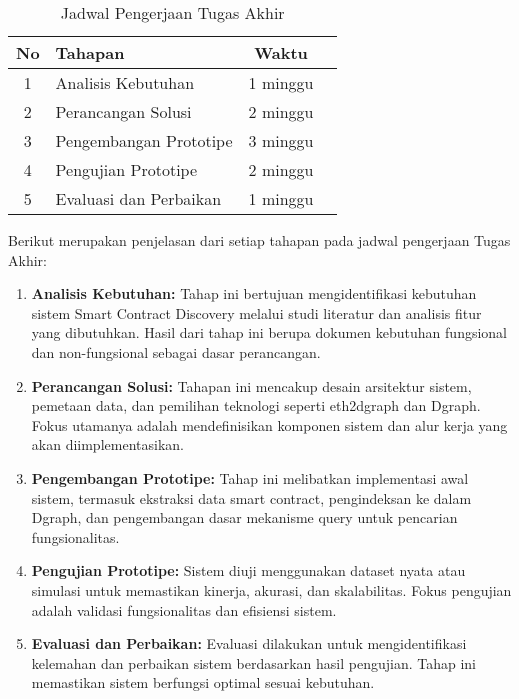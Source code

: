 \begin{table}[h]
	\caption{Jadwal Pengerjaan Tugas Akhir}
	\vspace{0.25cm}
	\begin{center}
		\begin{tabular}{|c|l|c|l|}
			\hline
			\textbf{No} & \textbf{Tahapan} & \textbf{Waktu} \\ \hline
			1 & Analisis Kebutuhan & 1 minggu \\ \hline
			2 & Perancangan Solusi & 2 minggu \\ \hline
			3 & Pengembangan Prototipe & 3 minggu \\ \hline
			4 & Pengujian Prototipe & 2 minggu \\ \hline
			5 & Evaluasi dan Perbaikan & 1 minggu \\ \hline
		\end{tabular}
	\end{center}
\end{table}

Berikut merupakan penjelasan dari setiap tahapan pada jadwal pengerjaan Tugas Akhir:

\begin{enumerate}
  \item \textbf{Analisis Kebutuhan:} Tahap ini bertujuan mengidentifikasi kebutuhan sistem Smart Contract Discovery melalui studi literatur dan analisis fitur yang dibutuhkan. Hasil dari tahap ini berupa dokumen kebutuhan fungsional dan non-fungsional sebagai dasar perancangan. 
  \item \textbf{Perancangan Solusi:} Tahapan ini mencakup desain arsitektur sistem, pemetaan data, dan pemilihan teknologi seperti eth2dgraph dan Dgraph. Fokus utamanya adalah mendefinisikan komponen sistem dan alur kerja yang akan diimplementasikan.
  \item \textbf{Pengembangan Prototipe:} Tahap ini melibatkan implementasi awal sistem, termasuk ekstraksi data smart contract, pengindeksan ke dalam Dgraph, dan pengembangan dasar mekanisme query untuk pencarian fungsionalitas.
  \item \textbf{Pengujian Prototipe:} Sistem diuji menggunakan dataset nyata atau simulasi untuk memastikan kinerja, akurasi, dan skalabilitas. Fokus pengujian adalah validasi fungsionalitas dan efisiensi sistem.
  \item \textbf{Evaluasi dan Perbaikan:} Evaluasi dilakukan untuk mengidentifikasi kelemahan dan perbaikan sistem berdasarkan hasil pengujian. Tahap ini memastikan sistem berfungsi optimal sesuai kebutuhan.
\end{enumerate}

